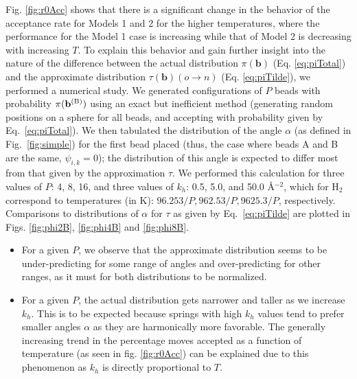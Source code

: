                 Fig. \ref{fig:r0Acc} shows that there is a significant change in the behavior of the acceptance rate for Models 1 and 2 for the higher temperatures, where the performance for the Model 1 case is increasing while that of Model 2 is decreasing with increasing $T$. To explain this behavior and gain further insight into the nature of the difference between the actual distribution $\pi({\mathbf b})$ (Eq. \eqref{eq:piTotal}) and the approximate distribution $\tau({\mathbf b}) (o \to n)$ (Eq. \eqref{eq:piTilde}), we performed a numerical study. We generated configurations of $P$ beads with probability $\pi({\bf{b}}^{\textrm{(B)}})$ using an exact but inefficient method (generating random positions on a sphere for all beads, and accepting with probability given by Eq.~\eqref{eq:piTotal}). We then tabulated the distribution of the angle $\alpha$ (as defined in Fig.~\ref{fig:simple}) for the first bead placed (thus, the case where beads A and B are the same, $\psi_{i,k} = 0$); the distribution of this angle is expected to differ most from that given by the approximation $\tau$. We performed this calculation for three values of $P$: 4, 8, 16, and three values of $k_h$: 0.5, 5.0, and 50.0 \AA$^{-2}$, which for H$_2$ correspond to temperatures (in K): $96.253/P, 962.53/P, 9625.3/P$, respectively. Comparisons to distributions of $\alpha$ for $\tau$ as given by Eq.~\eqref{eq:piTilde}  are plotted in Figs. \ref{fig:phi2B}, \ref{fig:phi4B} and \ref{fig:phi8B}.
                \begin{itemize}
                    \item For a given $P$, we observe that the approximate distribution seems to be under-predicting for some range of angles and over-predicting for other ranges, as it must for both distributions to be normalized.
                    \item For a given $P$, the actual distribution gets narrower and taller as we increase $k_h$. This is to be expected because springs with high $k_h$ values tend to prefer smaller angles $\alpha$ as they are harmonically more favorable. The generally increasing trend in the percentage moves accepted as a function of temperature (as seen in fig. \ref{fig:r0Acc}) can be explained due to this phenomenon as $k_h$ is directly proportional to $T$.
                \end{itemize}

